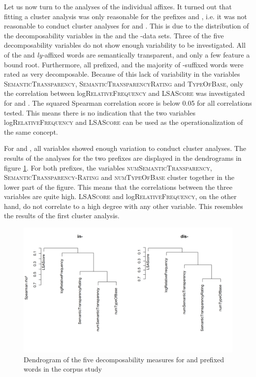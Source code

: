 
 Let us now turn to the analyses of the individual affixes.
 It turned out that fitting a cluster analysis was only reasonable for the prefixes  and , i.e. it was not reasonable to conduct cluster analyses for  and . 
 This is due to the distribution of the decomposability variables in the  and the -data sets. Three of the five decomposability variables do not show enough variability to be investigated. All of the  and \textit{ly-}affixed words are semantically transparent, and only a few feature a bound root. Furthermore, all prefixed, and the majority of -suffixed words were rated as very decomposable. Because of this lack of variability in the variables \textsc{SemanticTransparency}, \textsc{SemanticTransparencyRating} and \textsc{TypeOfBase}, only the correlation between log\textsc{RelativeFrequency} and \textsc{LSAScore} was investigated for  and .
 The squared Spearman correlation score is below 0.05 for all correlations tested. This means there is no indication that the two variables log\textsc{RelativeFrequency} and \textsc{LSAScore} can be used as the operationalization of the same concept.
 
 
 
 
 
 For  and , all variables showed enough variation to conduct cluster analyses. The results of the analyses for the two prefixes are displayed in the dendrograms in figure \ref{fig:cluster corpus dis and in}. 
 For both prefixes, the variables \textsc{numSemanticTransparency}, \textsc{SemanticTransparency-Rating} and \textsc{numTypeOfBase} cluster together in the lower part of the figure. This means that the correlations between the three variables are quite high. \textsc{LSAScore} and log\textsc{RelativeFrequency}, on the other hand, do not correlate to a high degree with any other variable. This resembles the results of the first cluster analysis.

\begin{figure} []
	\centering
	\includegraphics[scale=0.5]{images/Corpus/clusterAnalysisDecomposabilityCorpusDisAndIn.png}
	\caption{ Dendrogram of the five decomposability measures for  and prefixed words in the corpus study}
	\label{fig:cluster corpus dis and in}
\end{figure}



